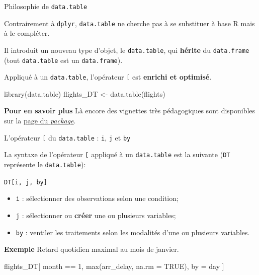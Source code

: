 \documentclass[12pt,handout,ignorenonframetext,]{beamer}
\newenvironment{Shaded}{}{}
\newcommand{\KeywordTok}[1]{\textcolor[rgb]{0.00,0.00,1.00}{{#1}}}
\newcommand{\DataTypeTok}[1]{{#1}}
\newcommand{\DecValTok}[1]{{#1}}
\newcommand{\StringTok}[1]{\textcolor[rgb]{0.00,0.50,0.50}{{#1}}}
\newcommand{\OtherTok}[1]{\textcolor[rgb]{1.00,0.25,0.00}{{#1}}}
\newcommand{\NormalTok}[1]{{#1}}
\providecommand{\tightlist}{%
\setlength{\itemsep}{0pt}\setlength{\parskip}{0pt}}
\renewenvironment{Shaded}{\begin{snugshade}}{\end{snugshade}}
\begin{document}
\begin{frame}[fragile]{Philosophie de \texttt{data.table}}

Contrairement à \texttt{dplyr}, \texttt{data.table} ne cherche pas à se
substituer à base R mais à le compléter.

Il introduit un nouveau type d'objet, le \texttt{data.table}, qui
\textbf{hérite} du \texttt{data.frame} (tout \texttt{data.table} est un
\texttt{data.frame}).

Appliqué à un \texttt{data.table}, l'opérateur \texttt{{[}} est
\textbf{enrichi et optimisé}.

\begin{Shaded}
\begin{Highlighting}[]
\KeywordTok{library}\NormalTok{(data.table)}
\NormalTok{flights_DT <-}\StringTok{ }\KeywordTok{data.table}\NormalTok{(flights)}
\end{Highlighting}
\end{Shaded}

\textbf{Pour en savoir plus} Là encore des vignettes très pédagogiques
sont disponibles sur la
\href{https://cran.r-project.org/package=data.table}{\underline{page du \textit{package}}}.

\end{frame}

\begin{frame}[fragile]{L'opérateur \texttt{{[}} du \texttt{data.table} :
\texttt{i}, \texttt{j} et \texttt{by}}

La syntaxe de l'opérateur \texttt{{[}} appliqué à un \texttt{data.table}
est la suivante (\texttt{DT} représente le \texttt{data.table}):

\centering \large

\texttt{DT{[}i,\ j,\ by{]}}

\raggedright \normalsize

\begin{itemize}
\tightlist
\item
  \texttt{i} : sélectionner des observations selon une condition;
\item
  \texttt{j} : sélectionner ou \textbf{créer} une ou plusieurs
  variables;
\item
  \texttt{by} : ventiler les traitements selon les modalités d'une ou
  plusieurs variables.
\end{itemize}

\bigskip 

\textbf{Exemple} Retard quotidien maximal au mois de janvier.

\small

\begin{Shaded}
\begin{Highlighting}[]
\NormalTok{flights_DT[}
  \NormalTok{month ==}\StringTok{ }\DecValTok{1}\NormalTok{, }\KeywordTok{max}\NormalTok{(arr_delay, }\DataTypeTok{na.rm =} \OtherTok{TRUE}\NormalTok{), by =}\StringTok{ }\NormalTok{day}
\NormalTok{]}
\end{Highlighting}
\end{Shaded}

\end{frame}
\end{document}
